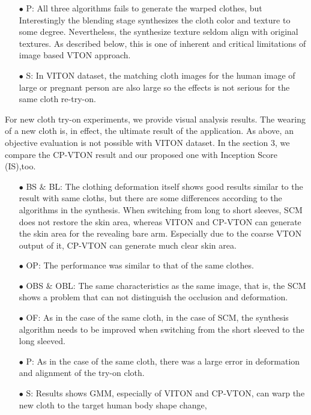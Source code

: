 \begin{itemize}
\item[$\bullet$] P: All three algorithms fails to generate the warped clothes, but Interestingly the blending stage synthesizes the cloth color and texture to some degree. Nevertheless, the synthesize texture seldom align with original textures. As described  below, this is one of inherent and critical limitations of image based VTON approach.  


\item[$\bullet$] S: In VITON dataset, the matching cloth images for the human image of large or pregnant person are also large so the effects is not serious for the same cloth re-try-on.
\end{itemize}

 
 For new cloth try-on experiments, we provide visual analysis results. The wearing of a new cloth is, in effect, the ultimate result of the application. As above, an objective evaluation is not possible with VITON dataset. In the section 3, we compare the CP-VTON result and our proposed one with Inception Score (IS),too.
 
\begin{itemize}

\item[$\bullet$] BS $\&$ BL: The clothing deformation itself shows good results similar to the result with same cloths, but there are some differences according to the algorithms in the synthesis. When switching from long to short sleeves, SCM does not restore the skin area, whereas VITON and CP-VTON can generate the skin area for the revealing bare arm. Especially due to the coarse VTON output of it, CP-VTON can generate much clear skin area.

\item[$\bullet$] OP: The performance was similar to that of the same clothes.

\item[$\bullet$] OBS $\&$ OBL: The same characteristics as the same image, that is, the SCM shows a problem that can not distinguish the occlusion and deformation.

\item[$\bullet$] OF: As in the case of the same cloth, in the case of SCM, the synthesis algorithm needs to be improved when switching from the short sleeved to the long sleeved.

\item[$\bullet$] P: As in the case of the same cloth, there was a large error in deformation and alignment of the try-on cloth.

\item[$\bullet$] S: Results shows GMM, especially of VITON and CP-VTON, can warp the new cloth to the target human body shape change, 

\end{itemize}

